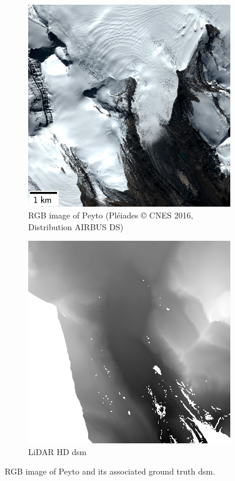 \begin{figure}
    \centering
    \begin{subfigure}[t]{0.48\linewidth}
        \flushleft
        \includegraphics[width=\linewidth]{Images/Chap_6/miniature_Peyto.png}
        \caption{RGB image of Peyto (Pléiades © CNES 2016, Distribution AIRBUS DS)}
        \label{fig:miniature_Peyto_rgb}
    \end{subfigure}\hfill
    \begin{subfigure}[t]{0.48\linewidth}
        \flushright
        \includegraphics[width=\linewidth]{Images/Chap_6/miniature_Peyto_gt.png}
        \caption{LiDAR HD \acrshort{dsm}}
        \label{fig:miniature_Peyto_gt}
    \end{subfigure}
    \caption{RGB image of Peyto and its associated ground truth \acrshort{dsm}.}
    \label{fig:miniature_Peyto}
\end{figure}

